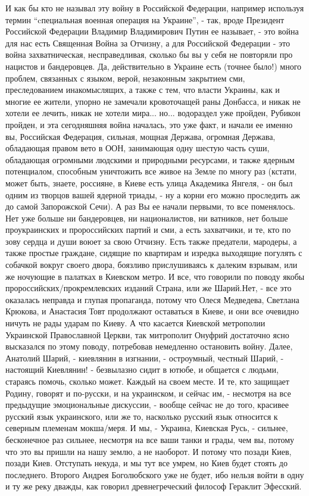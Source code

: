 И как бы кто не называл эту войну
в Российской Федерации, например используя термин \enquote{cпециальная военная
операция на Украине}, - так, вроде Президент Российской Федерации Владимир
Владимирович Путин ее называет, - это война для нас есть Священная Война за
Отчизну, а для Российской Федерации - это война захватническая, несправедливая,
сколько бы вы у себя не повторяли про нацистов и бандеровцев. Да, действительно
в Украине есть (точнее было!) много проблем, связанных с языком, верой,
незаконным закрытием сми, преследованием инакомыслящих, а также с тем, что
власти Украины, как и многие ее жители, упорно не замечали кровоточащей раны
Донбасса, и никак не хотели ее лечить, никак не хотели мира... но... водораздел
уже пройден, Рубикон пройден, и эта сегодняшняя война началась, это уже факт, и
начали ее именно вы, Российская Федерация, сильная, мощная Держава, огромная
Держава, обладающая правом вето в ООН, занимающая одну шестую часть суши,
обладающая огромными людскими и природными ресурсами, и также ядерным
потенциалом, способным уничтожить все живое на Земле по многу раз (кстати,
может быть, знаете, россияне, в Киеве есть улица Академика Янгеля, -  он был
одним из творцов вашей ядерной триады, - ну а корни его можно проследить аж до
самой Запорожской Сечи). А раз Вы ее начали первыми, то все поменялось. Нет
уже больше ни бандеровцев, ни националистов, ни ватников, нет больше
проукраинских и пророссийских партий и сми, а есть захватчики, и те, кто по
зову сердца и души воюет за свою Отчизну. Есть также предатели, мародеры, а
также простые граждане, сидящие по квартирам и изредка выходящие погулять с
собачкой вокруг своего двора, боязливо прислушиваясь к далеким взрывам, или же
ночующие в палатках в Киевском метро. И все, что говорили по поводу якобы
пророссийских/прокремлевских изданий Страна, или же Шарий.Нет, - все это
оказалась неправда и глупая пропаганда, потому что Олеся Медведева, Светлана
Крюкова, и Анастасия Товт продолжают оставаться в Киеве, и они все очевидно
ничуть не рады ударам по Киеву. А что касается Киевской метрополии Украинской
Православной Церкви, так митрополит Онуфрий достаточно ясно высказался по этому
поводу, потребовав немедленно остановить войну. Далее, Анатолий Шарий, -
киевлянин в изгнании, - остроумный, честный Шарий, - настоящий Киевлянин! -
безвылазно сидит в ютюбе, и общается с людьми, стараясь помочь, сколько может.
Каждый на своем месте. И те, кто защищает Родину, говорят и по-русски, и на
украинском, и сейчас им, - несмотря на все предыдущие эмоциональные дискуссии,
- вообще сейчас не до того, красивее русский язык украинского, или же то,
насколько русский язык относится к северным племенам мокша/меря. И мы, -
Украина, Киевская Русь, - сильнее, бесконечное раз сильнее, несмотря на все
ваши танки и грады, чем вы, потому что это вы пришли на нашу землю, а не
наоборот. И потому что позади Киев, позади Киев. Отступать некуда, и мы тут все
умрем, но Киев будет стоять до последнего. Второго Андрея Боголюбского уже не
будет, ибо нельзя войти в одну и ту же реку дважды, как говорил древнегреческий
философ Гераклит Эфесский.

